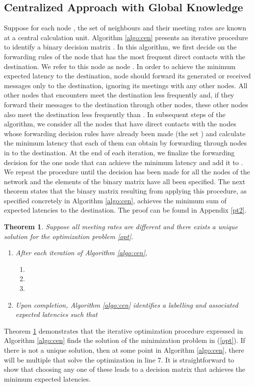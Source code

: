 \documentclass[journal,onecolumn,11pt]{IEEEtran}
\theoremstyle{plain}
\newtheorem{theorem}{Theorem}
\theoremstyle{definition}
\begin{document}
\subsection{Centralized Approach with Global Knowledge}
Suppose for each node , the set of neighbours
 and their meeting rates  are known at a central calculation unit. Algorithm
\ref{algo:cen} presents an iterative procedure to identify a binary
decision matrix . In this algorithm, we first decide on
the forwarding rules of the node that has the most frequent direct
contacts with the destination. We refer to this node as node . In
order to achieve the minimum expected latency to the destination, node
 should forward its generated or received messages only to the
destination, ignoring its meetings with any other nodes. All other
nodes that  encounters meet the destination less frequently and, if
they forward their messages to the destination through other nodes,
these other nodes also meet the destination less frequently than
. In subsequent steps of the algorithm, we consider all the nodes
that have direct contacts with the nodes whose forwarding decision
rules have already been made (the set ) and calculate the
minimum latency that each of them can obtain by forwarding through
nodes in  to the destination. At the end of each
iteration, we finalize the forwarding decision for the one node that
can achieve the minimum latency and add it to . We repeat
the procedure until the decision has been made for all the nodes of
the network and the elements of the binary matrix  have
all been specified.  The next theorem states that the binary matrix
 resulting from applying this procedure, as specified
concretely in Algorithm \ref{algo:cen}, achieves the minimum sum of
expected latencies to the destination. The proof can be found in
Appendix \ref{pt2}.

\begin{theorem}\label{theorem2}
  Suppose all meeting rates are different and there exists
  a unique solution  for the optimization problem \eqref{opt}.
\begin{enumerate}
\item After each iteration of Algorithm \ref{algo:cen},
\begin{enumerate}
\item 
\item 
\item 
\end{enumerate}
\item Upon completion, Algorithm \ref{algo:cen} identifies a labelling  and associated expected latencies  such that 
\end{enumerate}
\end{theorem}
Theorem \ref{theorem2} demonstrates that the iterative optimization
procedure expressed in Algorithm \ref{algo:cen} finds the solution of
the minimization problem in (\ref{opt}). If there is not a unique
solution, then at some point in Algorithm \ref{algo:cen}, there will
be multiple  that solve the optimization in line 7. It is
straightforward to show that choosing any one of these  leads to a
decision matrix  that achieves the minimum expected latencies. 
\end{document}
